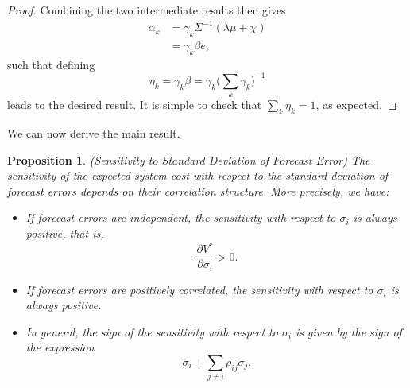\documentclass{article}
\newtheorem{proposition}{Proposition}
\begin{document}
\begin{proof}
Combining the two intermediate results then gives
\begin{align*}
\alpha_k &= \gamma_k \Sigma^{-1} (\lambda \mu + \chi)\\
&= \gamma_k \beta e,
\end{align*}
such that defining
\begin{equation*}
\eta_k = \gamma_k \beta =  \gamma_k \bigg(\sum_k \gamma_k\bigg)^{-1}
\end{equation*}
leads to the desired result. It is simple to check that $\sum_k \eta_k = 1$, as expected.
\end{proof}

We can now derive the main result.

\begin{proposition}\label{SensitivityStandardDeviation}
(Sensitivity to Standard Deviation of Forecast Error) The sensitivity of the expected system cost with respect to the standard deviation of forecast errors depends on their correlation structure. More precisely, we have:
\begin{itemize}
\item[(i)] If forecast errors are independent, the sensitivity with respect to $\sigma_i$ is always positive, that is, 
\begin{equation*}
\frac{\partial V^*}{\partial \sigma_i} > 0.
\end{equation*}
\item[(ii)] If forecast errors are positively correlated, the sensitivity with respect to $\sigma_i$ is always positive.
\item[(iii)] In general, the sign of the sensitivity with respect to $\sigma_i$ is given by the sign of the expression
\begin{equation*}
\sigma_i +\sum_{j \ne i} \rho_{ij} \sigma_j.
\end{equation*}
\end{itemize}
\end{proposition}
\end{document}
